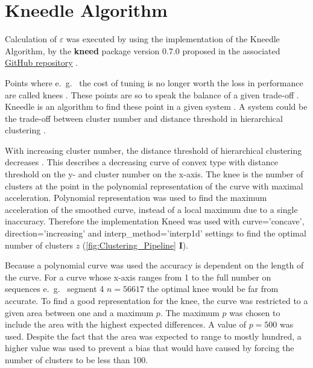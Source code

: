 \section{Kneedle Algorithm} \label{sec:Kneedle}

Calculation of $\varepsilon$ was executed by using the implementation of the Kneedle Algorithm, by the \textbf{kneed} package version 0.7.0 proposed in the associated \href{https://github.com/arvkevi/kneed.git}{GitHub repository} \autocite{satopaa_finding_2011}.

Points where e.~g.~ the cost of tuning is no longer worth the loss in performance are called \glqq knees\grqq{} \autocite{satopaa_finding_2011}. These points are so to speak the balance of a given trade-off \autocite{satopaa_finding_2011}. Kneedle is an algorithm to find these point in a given system \autocite{satopaa_finding_2011}. A system could be the trade-off between cluster number and distance threshold in hierarchical clustering \autocite{gower_minimum_1969}. 

With increasing cluster number, the distance threshold of hierarchical clustering decreases \autocite{gower_minimum_1969}. This describes a decreasing curve of convex type with distance threshold on the y- and cluster number on the x-axis. The knee is the number of clusters at the point in the polynomial representation of the curve with maximal acceleration. Polynomial representation was used to find the maximum acceleration of the smoothed curve, instead of a local maximum due to a single inaccuracy. Therefore the implementation Kneed was used with \colorbox{backcolour}{curve='concave'}, \colorbox{backcolour}{direction='increasing'} and \colorbox{backcolour}{interp\_method='interp1d'} settings to find the optimal number of clusters $z$ (\autoref{fig:Clustering_Pipeline} \textsf{\textbf{I}}).

Because a polynomial curve was used the accuracy is dependent on the length of the curve. For a curve whose x-axis ranges from 1 to the full number on sequences e.~g.~ segment 4 $n=56617$ the optimal knee would be far from accurate. To find a good representation for the knee, the curve was restricted to a given area between one and a maximum $p$. The maximum $p$ was chosen to include the area with the highest expected differences. A value of $p=500$ was used. Despite the fact that the area was expected to range to mostly hundred, a higher value was used to prevent a bias that would have caused by forcing the number of clusters to be less than 100.

